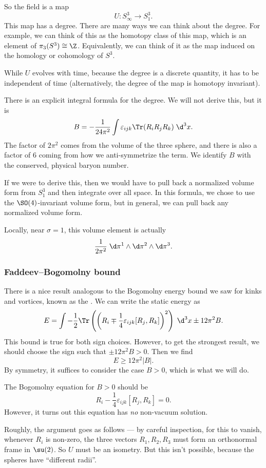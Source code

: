 \documentclass[a4paper]{article}
\begin{document}
So the field is a map
\[
  U: S^3_\infty \to S^3_1.
\]
This map has a degree. There are many ways we can think about the degree. For example, we can think of this as the homotopy class of this map, which is an element of $\pi_3(S^3) \cong \Z$. Equivalently, we can think of it as the map induced on the homology or cohomology of $S^3$.

While $U$ evolves with time, because the degree is a discrete quantity, it has to be independent of time (alternatively, the degree of the map is homotopy invariant).

There is an explicit integral formula for the degree. We will not derive this, but it is
\[
  B = - \frac{1}{24\pi^2} \int \varepsilon_{ijk} \Tr(R_i R_j R_k) \;\d^3 x.
\]
The factor of $2\pi^2$ comes from the volume of the three sphere, and there is also a factor of $6$ coming from how we anti-symmetrize the term. We identify $B$ with the conserved, physical baryon number.

If we were to derive this, then we would have to pull back a normalized volume form from $S_1^3$ and then integrate over all space. In this formula, we chose to use the $\SO(4)$-invariant volume form, but in general, we can pull back any normalized volume form.

Locally, near $\sigma = 1$, this volume element is actually
\[
  \frac{1}{2\pi^2}\;\d \pi^1 \wedge\d \pi^2 \wedge\d \pi^3.
\]
\subsubsection*{Faddeev--Bogomolny bound}
There is a nice result analogous to the Bogomolny energy bound we saw for kinks and vortices, known as the . We can write the static energy as
\[
  E = \int - \frac{1}{2} \Tr\left(\left(R_i \mp \frac{1}{4} \varepsilon_{ijk}[R_j, R_k]\right)^2\right)\;\d^3 x \pm 12 \pi^2 B.
\]
This bound is true for both sign choices. However, to get the strongest result, we should choose the sign such that $\pm 12 \pi^2 B > 0$. Then we find
\[
  E \geq 12 \pi^2 |B|.
\]
By symmetry, it suffices to consider the case $B > 0$, which is what we will do.

The Bogomolny equation for $B > 0$ should be
\[
  R_i - \frac{1}{4} \varepsilon_{ijk} [R_j, R_k] = 0.
\]
However, it turns out this equation has \emph{no} non-vacuum solution.

Roughly, the argument goes as follows --- by careful inspection, for this to vanish, whenever $R_i$ is non-zero, the three vectors $R_1, R_2, R_3$ must form an orthonormal frame in $\su(2)$. So $U$ must be an isometry. But this isn't possible, because the spheres have ``different radii''.
\end{document}
